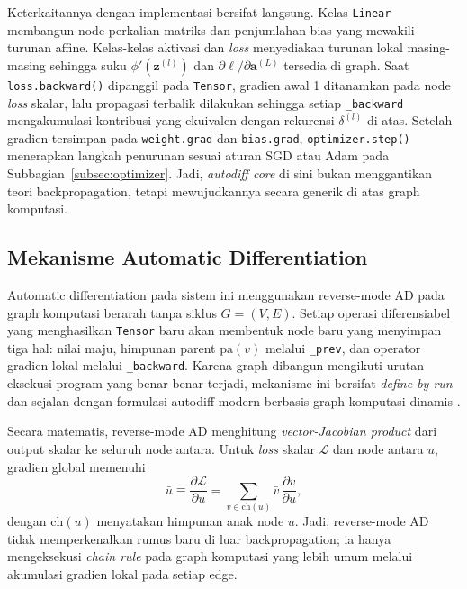 \documentclass{article}
\begin{document}
Keterkaitannya dengan implementasi bersifat langsung. Kelas \texttt{Linear} membangun node perkalian matriks dan penjumlahan bias yang mewakili turunan affine. Kelas-kelas aktivasi dan \textit{loss} menyediakan turunan lokal masing-masing sehingga suku $\phi'(\mathbf{z}^{(l)})$ dan $\partial \ell / \partial \mathbf{a}^{(L)}$ tersedia di graph. Saat \texttt{loss.backward()} dipanggil pada \texttt{Tensor}, gradien awal 1 ditanamkan pada node \textit{loss} skalar, lalu propagasi terbalik dilakukan sehingga setiap \texttt{\_backward} mengakumulasi kontribusi yang ekuivalen dengan rekurensi $\delta^{(l)}$ di atas. Setelah gradien tersimpan pada \texttt{weight.grad} dan \texttt{bias.grad}, \texttt{optimizer.step()} menerapkan langkah penurunan sesuai aturan SGD atau Adam pada Subbagian~\ref{subsec:optimizer}. Jadi, \textit{autodiff core} di sini bukan menggantikan teori backpropagation, tetapi mewujudkannya secara generik di atas graph komputasi.

\subsection{Mekanisme Automatic Differentiation}
\label{subsec:autodiff}
Automatic differentiation pada sistem ini menggunakan reverse-mode AD pada graph komputasi berarah tanpa siklus $G=(V,E)$. Setiap operasi diferensiabel yang menghasilkan \texttt{Tensor} baru akan membentuk node baru yang menyimpan tiga hal: nilai maju, himpunan parent $\mathrm{pa}(v)$ melalui \texttt{\_prev}, dan operator gradien lokal melalui \texttt{\_backward}. Karena graph dibangun mengikuti urutan eksekusi program yang benar-benar terjadi, mekanisme ini bersifat \textit{define-by-run} dan sejalan dengan formulasi autodiff modern berbasis graph komputasi dinamis \citep{baydin2018ad,paszke2019pytorch}.

Secara matematis, reverse-mode AD menghitung \textit{vector-Jacobian product} dari output skalar ke seluruh node antara. Untuk \textit{loss} skalar $\mathcal{L}$ dan node antara $u$, gradien global memenuhi
\begin{equation}
\bar{u} \equiv \frac{\partial \mathcal{L}}{\partial u}
=
\sum_{v\in \mathrm{ch}(u)}
\bar{v}\,
\frac{\partial v}{\partial u},
\end{equation}
dengan $\mathrm{ch}(u)$ menyatakan himpunan anak node $u$. Jadi, reverse-mode AD tidak memperkenalkan rumus baru di luar backpropagation; ia hanya mengeksekusi \textit{chain rule} pada graph komputasi yang lebih umum melalui akumulasi gradien lokal pada setiap edge.
\end{document}
